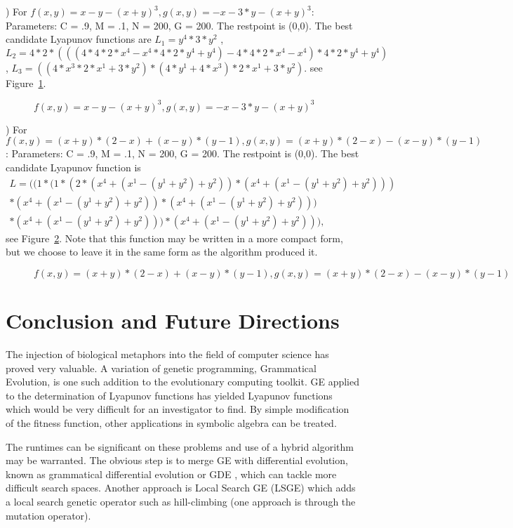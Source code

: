 \documentclass[12pt]{article}
\begin{document}
) For {\color{ExampleDarkBlue}$f(x,y) = x-y-(x+y)^3, g(x,y) = -x-3*y-(x+y)^3$}:
Parameters:  
C = .9, M = .1, N = 200, G = 200.  The restpoint is (0,0).
The best candidate Lyapunov functions are
$L_1 = y^4*3*y^2$ ,
$L_2 = 4*2*(((4*4*2*x^4-x^4*4*2*y^4+y^4)-4*4*2*x^4-x^4)*4*2*y^4+y^4)$,
$L_3 = ((4*x^3*2*x^1+3*y^2)*(4*y^1+4*x^3)*2*x^1+3*y^2)$. see Figure~\ref{three}.
\begin{figure}[tbh]
\caption{\label{three}$f(x,y) = x-y-(x+y)^3, g(x,y) = -x-3*y-(x+y)^3$}
\end{figure}

) For {\color{ExampleDarkBlue}$f(x,y) = (x+y)*(2-x)+(x-y)*(y-1), g(x,y) = (x+y)*(2-x)-(x-y)*(y-1)$}:
Parameters:  C = .9, M = .1, N = 200, G = 200.   The restpoint is (0,0).
The best candidate Lyapunov function is
$$
\begin{array}{l}
L= ((1*(1*(2*(x^4+(x^1-(y^1+y^2)+y^2))*(x^4+(x^1-(y^1+y^2)+y^2)))\\
*(x^4+(x^1-(y^1+y^2)+y^2))*(x^4+(x^1-(y^1+y^2)+y^2)))\\
*(x^4+(x^1-(y^1+y^2)+y^2)))*(x^4+(x^1-(y^1+y^2)+y^2))),\end{array}$$
see Figure~\ref{four}.  Note that this function may be written in a
more compact form, but we choose to leave it in the same form as the
algorithm produced it.
\begin{figure}[tbh]
\caption{\label{four}$f(x,y) = (x+y)*(2-x)+(x-y)*(y-1), g(x,y) = (x+y)*(2-x)-(x-y)*(y-1)$}
\end{figure}


\section{Conclusion and Future Directions}

The injection of biological metaphors into the field of computer
science has proved very valuable. A variation of genetic programming,
Grammatical Evolution, is one such addition to the evolutionary
computing toolkit.  GE applied to the determination of Lyapunov
functions has yielded Lyapunov functions which would be very difficult
for an investigator to find.  By simple modification of the fitness
function, other applications in symbolic algebra can be treated.

The runtimes can be significant on these problems and use of a hybrid
algorithm may be warranted.  The obvious step is to merge GE with
differential evolution, known as grammatical differential evolution or
GDE \cite{oneill:2006:gde}, which can tackle more difficult search
spaces.  Another approach is Local Search GE (LSGE) which adds a local
search genetic operator such as hill-climbing (one approach is through
the mutation operator).
\end{document}
